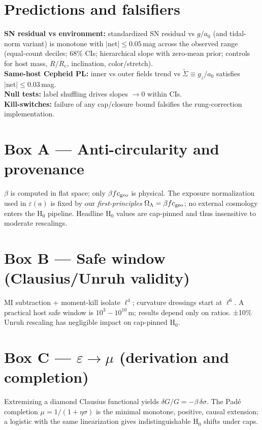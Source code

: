 \documentclass[aps,prd,preprint,onecolumn,longbibliography,nofootinbib]{revtex4-2}
\theoremstyle{plain}
\theoremstyle{remark}
\newcommand{\OmL}{\Omega_\Lambda}
\newcommand{\be}{\beta}
\newcommand{\eps}{\varepsilon}
\begin{document}
\section{Predictions and falsifiers}\label{sec:falsifiers}
\textbf{SN residual vs environment:} standardized SN residual vs $g/a_0$ (and tidal-norm variant) is monotone with $|\text{net}|\le 0.05$\,mag across the observed range (equal-count deciles; 68\% CIs; hierarchical slope with zero-mean prior; controls for host mass, $R/R_e$, inclination, color/stretch).\\
\textbf{Same-host Cepheid PL:} inner vs outer fields trend vs $\tilde{\Sigma}\!\equiv\!g_z/a_0$ satisfies $|\text{net}|\le 0.03$\,mag.\\
\textbf{Null tests:} label shuffling drives slopes $\to 0$ within CIs.\\
\textbf{Kill-switches:} failure of any cap/closure bound falsifies the rung-correction implementation.

\section*{Box A — Anti-circularity and provenance}
$\be$ is computed in flat space; only $\be f c_{\rm geo}$ is physical. The exposure normalization used in $\eps(a)$ is fixed by our \emph{first-principles} $\OmL=\be f c_{\rm geo}$; no external cosmology enters the H$_0$ pipeline. Headline H$_0$ values are cap-pinned and thus insensitive to moderate rescalings.

\section*{Box B — Safe window (Clausius/Unruh validity)}
MI subtraction + moment-kill isolate $\ell^4$; curvature dressings start at $\ell^6$. A practical host safe window is $10^3\!-\!10^{10}$\,m; results depend only on ratios. ±10\% Unruh rescaling has negligible impact on cap-pinned H$_0$.

\section*{Box C — $\eps\!\to\!\mu$ (derivation and completion)}
Extremizing a diamond Clausius functional yields $\delta G/G=-\be\,\delta\sigma$. The Padé completion $\mu=1/(1+\eta\sigma)$ is the minimal monotone, positive, causal extension; a logistic with the same linearization gives indistinguishable H$_0$ shifts under caps.
\end{document}

